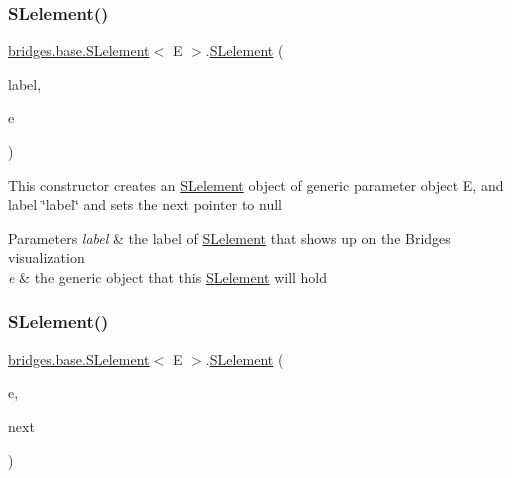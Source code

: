 \subsubsection{\texorpdfstring{S\+Lelement()}{SLelement()}\hspace{0.1cm}{\footnotesize\ttfamily [2/5]}}
{\footnotesize\ttfamily \hyperlink{classbridges_1_1base_1_1_s_lelement}{bridges.\+base.\+S\+Lelement}$<$ E $>$.\hyperlink{classbridges_1_1base_1_1_s_lelement}{S\+Lelement} (\begin{DoxyParamCaption}\item[{String}]{label,  }\item[{E}]{e }\end{DoxyParamCaption})}

This constructor creates an \hyperlink{classbridges_1_1base_1_1_s_lelement}{S\+Lelement} object of generic parameter object E, and label \char`\"{}label\char`\"{} and sets the next pointer to null


\begin{DoxyParams}{Parameters}
{\em label} & the label of \hyperlink{classbridges_1_1base_1_1_s_lelement}{S\+Lelement} that shows up on the Bridges visualization \\
\hline
{\em e} & the generic object that this \hyperlink{classbridges_1_1base_1_1_s_lelement}{S\+Lelement} will hold \\
\hline
\end{DoxyParams}
\mbox{\label{classbridges_1_1base_1_1_s_lelement_abc5e333fd2f3289eede108175908f97d}} 
\subsubsection{\texorpdfstring{S\+Lelement()}{SLelement()}\hspace{0.1cm}{\footnotesize\ttfamily [3/5]}}
{\footnotesize\ttfamily \hyperlink{classbridges_1_1base_1_1_s_lelement}{bridges.\+base.\+S\+Lelement}$<$ E $>$.\hyperlink{classbridges_1_1base_1_1_s_lelement}{S\+Lelement} (\begin{DoxyParamCaption}\item[{E}]{e,  }\item[{\hyperlink{classbridges_1_1base_1_1_s_lelement}{S\+Lelement}$<$ E $>$}]{next }\end{DoxyParamCaption})}

